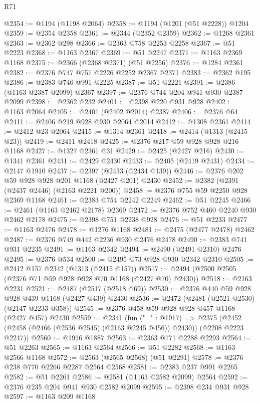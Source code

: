 \begin{lexlean}{R71}
\begin{coremodule}
@2354 := @1194 (@1198 @2064)
@2358 := @1194 (@1201 (@51 @2228)) @1204
@2359 := @2354 @2358
@2361 := @2344 (@2352 @2359)
@2362 := @1268 @2361
@2363 := @2362 @298
@2366 := @2363 @758 @2253 @2258
@2367 := @51 @2223
@2368 := @1163 @2367
@2369 := @51 @2247
@2371 := @1163 @2369 @1168
@2375 := @2366 (@2368 @2371) (@51 @2256)
@2376 := @1284 @2361
@2382 := @2376 @747 @757 @2226 @2252 @2367 @2371
@2383 := @2362 @195
@2386 := @2383 @746 @991 @2225
@2387 := @51 @2221
@2391 := @2386 (@1163 @2387 @2099) @2367
@2397 := @2376 @744 @204 @941 @930 @2387 @2099
@2398 := @2362 @232
@2401 := @2398 @220 @931 @928
@2402 := @1163 @2064
@2405 := @2401 (@2402 @2014) @2387
@2406 := @2376 @64
@2411 := @2406 @219 @928 @930 @2064 @2014
@2412 := @1308 @2361
@2414 := @2412 @23 @2064
@2415 := @1314 @2361
@2418 := @2414 (@1313 (@2415 @23))
@2419 := @2411 @2418
@2425 := @2376 @217 @59 @928 @928 @216 @1168
@2427 := @1327 @2361 @31
@2429 := @2425 (@2427 @216)
@2430 := @1341 @2361
@2431 := @2429 @2430
@2433 := @2405 (@2419 @2431)
@2434 := @2147 @1910
@2437 := @2397 (@2433 (@2434 @139))
@2446 := @2376 @202 @59 @928 @928 @201 @1168 (@2427 @201) @2430
@2452 := @2382 (@2391 (@2437 @2446) (@2163 @2221 @200))
@2458 := @2376 @755 @59 @2250 @928 @2369 @1168
@2461 := @2383 @754 @2242 @2249
@2462 := @51 @2245
@2466 := @2461 (@1163 @2462 @2178) @2369
@2472 := @2376 @752 @460 @2240 @930 @2462 @2178
@2475 := @2398 @751 @2238 @928
@2476 := @51 @2233
@2477 := @1163 @2476
@2478 := @1276 @1168
@2481 := @2475 (@2477 @2478) @2462
@2487 := @2376 @749 @442 @2236 @930 @2476 @2478
@2490 := @2383 @741 @931 @2235
@2491 := @1163 @2342
@2494 := @2490 (@2491 @2310) @2476
@2495 := @2376 @534
@2500 := @2495 @73 @928 @930 @2342 @2310
@2505 := @2412 @157 @2342 (@1313 (@2415 @157))
@2517 := @2494 (@2500 @2505 (@2376 @71 @59 @928 @928 @70 @1168 (@2427 @70) @2430))
@2518 := @2163 @2231
@2521 := @2487 (@2517 (@2518 @69))
@2530 := @2376 @440 @59 @928 @928 @439 @1168 (@2427 @439) @2430
@2536 := @2472 (@2481 (@2521 @2530) (@2147 @2233 @358))
@2545 := @2376 @458 @59 @928 @928 @457 @1168 (@2427 @457) @2430
@2559 := @2341
    (fun ("_" : @1917) =>
    @2375 (@2452 (@2458 (@2466 (@2536 @2545) (@2163 @2245 @456)) @2430)) (@2208 @2223 @2247))
@2560 := @1916 @1887
@2563 := @2363 @771 @2288 @2293
@2564 := @51 @2263
@2565 := @1163 @2564
@2566 := @51 @2282
@2568 := @1163 @2566 @1168
@2572 := @2563 (@2565 @2568) (@51 @2291)
@2578 := @2376 @238 @770 @2266 @2287 @2564 @2568
@2581 := @2383 @237 @991 @2265
@2582 := @51 @2261
@2586 := @2581 (@1163 @2582 @2099) @2564
@2592 := @2376 @235 @204 @941 @930 @2582 @2099
@2595 := @2398 @234 @931 @928
@2597 := @1163 @209 @1168

\end{coremodule}
\end{lexlean}
